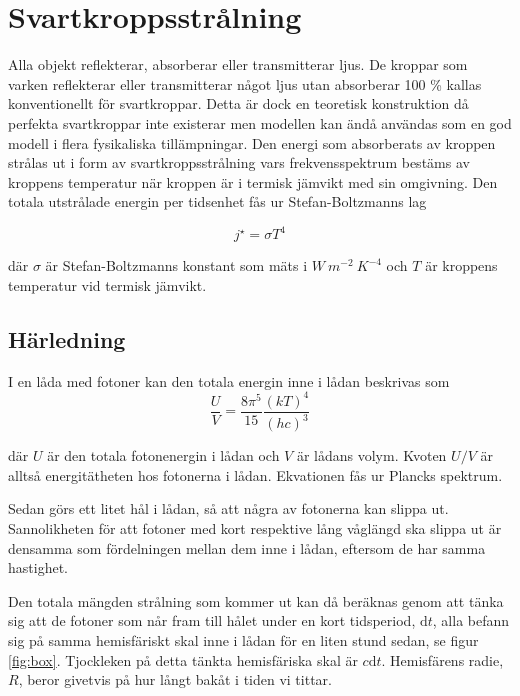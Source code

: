 \section{Svartkroppsstrålning}
\label{sec:blackbody}

Alla objekt reflekterar, absorberar eller transmitterar ljus. De kroppar som varken 
reflekterar eller transmitterar något ljus utan absorberar 100 \% kallas konventionellt för svartkroppar. Detta är dock en teoretisk konstruktion då perfekta svartkroppar inte existerar men modellen kan ändå användas som en god modell i flera fysikaliska 
tillämpningar. Den energi som absorberats av kroppen strålas ut i form av svartkroppsstrålning vars 
frekvensspektrum bestäms av kroppens temperatur när kroppen är i termisk jämvikt med
 sin omgivning. Den totala utstrålade energin per tidsenhet fås ur Stefan-Boltzmanns lag
 
\begin{equation}
\label{eq:boltzmanslag}
\boxed{ \; \; \;
j^{\star} = \sigma T^{4}
\; \; \; }
\end{equation}

\noindent
där $\sigma$ är Stefan-Boltzmanns konstant som mäts i $\unit{W~m^{-2}~K^{-4}}$ och $T$ är kroppens temperatur vid termisk jämvikt.

\subsection{Härledning}
I en låda med fotoner kan den totala energin inne i lådan beskrivas som 
\begin{equation}
\label{eq:photonbox}
\frac{U}{V}=\frac{8\pi^5}{15}\frac{(kT)^4}{(hc)^3}
\end{equation}

där $U$ är den totala fotonenergin i lådan och $V$ är lådans volym. Kvoten $U/V$ är alltså energitätheten hos fotonerna i lådan. Ekvationen fås ur Plancks spektrum.\cite[ss.301-302]{schroeder00}

Sedan görs ett litet hål i lådan, så att några av fotonerna kan slippa ut. Sannolikheten för att fotoner med kort respektive lång våglängd ska slippa ut är densamma som fördelningen mellan dem inne i lådan, eftersom de har samma hastighet.

Den totala mängden strålning som kommer ut kan då beräknas genom att tänka sig att 
de fotoner som når fram till hålet under en kort tidsperiod, $\mathrm{d}t$, alla befann sig
 på samma hemisfäriskt skal inne i lådan för en liten stund sedan, se figur \ref{fig:box}. Tjockleken på detta tänkta hemisfäriska skal är $c\mathrm{d}t$. Hemisfärens radie, $R$, beror givetvis på hur långt bakåt i tiden vi tittar.

